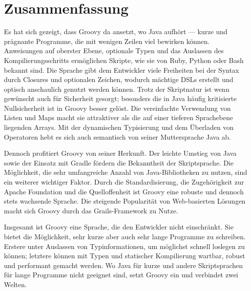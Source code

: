 \documentclass[a4paper]{article}
\begin{document}

\section{Zusammenfassung}\label{sec:zusammenfassung}

Es hat sich gezeigt, dass Groovy da ansetzt, wo Java aufhört --- kurze und prägnante Programme, die mit wenigen Zeilen viel bewirken können.
Anweisungen auf oberster Ebene, optionale Typen und das Auslassen des Kompilierungsschritts ermöglichen Skripte, wie sie von Ruby, Python oder Bash bekannt sind.
Die Sprache gibt dem Entwickler viele Freiheiten bei der Syntax durch Closures und optionalen Zeichen, wodurch mächtige DSLs erstellt und optisch anschaulich genutzt werden können.
Trotz der Skriptnatur ist wenn gewünscht auch für Sicherheit gesorgt;
besonders die in Java häufig kritisierte Nullsicherheit ist in Groovy besser gelöst.
Die vereinfachte Verwendung von Listen und Maps macht sie attraktiver als die auf einer tieferen Sprachebene liegenden Arrays.
Mit der dynamischen Typisierung und dem Überladen von Operatoren hebt es sich auch semantisch von seiner Muttersprache Java ab.

Dennoch profitiert Groovy von seiner Herkunft.
Der leichte Umstieg von Java sowie der Einsatz mit Gradle fördern die Bekanntheit der Skriptsprache.
Die Möglichkeit, die sehr umfangreiche Anzahl von Java-Bibliotheken zu nutzen, sind ein weiterer wichtiger Faktor.
Durch die Standardisierung, die Zugehörigkeit zur Apache Foundation und die Quelloffenheit ist Groovy eine robuste und dennoch stets wachsende Sprache.
Die steigende Popularität von Web-basierten Lösungen macht sich Groovy durch das Grails-Framework zu Nutze.

Insgesamt ist Groovy eine Sprache, die den Entwickler nicht einschränkt.
Sie bietet die Möglichkeit, sehr kurze aber auch sehr lange Programme zu schreiben.
Erstere unter Auslassen von Typinformationen, um möglichst schnell loslegen zu können;
letztere können mit Typen und statischer Kompilierung wartbar, robust und performant gemacht werden.
Wo Java für kurze und andere Skriptsprachen für lange Programme nicht geeignet sind, setzt Groovy ein und verbindet zwei Welten.





\end{document}
